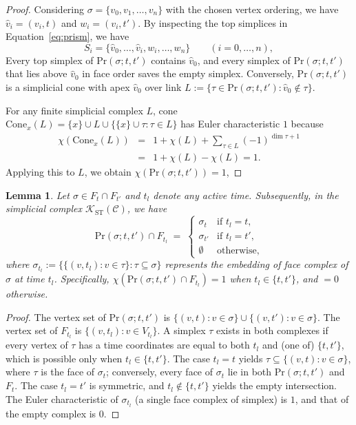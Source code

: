 \documentclass[
    pre,
    twocolumn,
    superscriptaddress,
    showpacs,
    nofootinbib,
    amsmath,
    amssymb,
    floatfix
]{revtex4-2}
\newcommand{\K}{\mathcal{K}}
\theoremstyle{plain} %
\newtheorem{lemma}[theorem]{\indent Lemma}
\theoremstyle{definition} %
\begin{document}
\begin{proof}
Considering $\sigma = \{v_0, v_1, \ldots, v_n\}$ with the chosen vertex
ordering, we have $\hat v_i = (v_i, t)$ and $w_i = (v_i, t')$.
By inspecting the top simplices in Equation~\eqref{eq:prism}, we have
\[
    S_i = \{\hat v_0, \ldots, \hat v_i, w_i, \ldots, w_n\}
    \qquad (i = 0, \ldots, n),
\]
Every top simplex of $\mathrm{Pr}(\sigma; t, t')$ contains $\hat v_0$, and every simplex of $\mathrm{Pr}(\sigma; t, t')$ that lies above $\hat v_0$ in face order saves the empty simplex.
Conversely, $\mathrm{Pr}(\sigma; t, t')$ is a simplicial cone with apex $\hat v_0$ over link $L := \{\tau \in \mathrm{Pr}(\sigma; t, t') : \hat v_0 \notin \tau\}$.

For any finite simplicial complex $L$, cone $\mathrm{Cone}_{x}(L) =
\{x\} \cup L \cup \{\{x\} \cup \tau : \tau \in L\}$ has Euler
characteristic $1$ because 
\begin{eqnarray*}
    \chi(\mathrm{Cone}_x(L))
    &=& 1 + \chi(L) + \sum_{\tau \in L}(-1)^{\dim\tau + 1}\\
    &=& 1 + \chi(L) - \chi(L) = 1.
\end{eqnarray*}
Applying this to $L$, we obtain
$\chi(\mathrm{Pr}(\sigma; t, t')) = 1$,
\end{proof}

\begin{lemma}
\label{lem:prism_snapshot}
Let $\sigma \in F_t \cap F_{t'}$ and $t_l$ denote any active time.
Subsequently, in the simplicial complex $\K_{\mathrm{ST}}(\mathcal{C})$, we have
\begin{equation*}\label{eq:prism_meet_snap}
    \mathrm{Pr}(\sigma; t, t') \cap F_{t_l}
    \;=\;
    \begin{cases}
        \sigma_t & \text{if } t_l = t,\\
        \sigma_{t'} & \text{if } t_l = t',\\
        \emptyset & \text{otherwise,}
    \end{cases}
\end{equation*}
where $\sigma_{t_l} := \{\{(v, t_l) : v \in \tau\} : \tau \subseteq \sigma\}$
represents the embedding of face complex of $\sigma$ at time $t_l$.
Specifically, $\chi(\mathrm{Pr}(\sigma; t, t') \cap F_{t_l}) = 1$ when
$t_l \in \{t, t'\}$, and $= 0$ otherwise.
\end{lemma}

\begin{proof}
The vertex set of $\mathrm{Pr}(\sigma; t, t')$ is $\{(v, t): v \in \sigma\}
\cup \{(v, t') : v \in \sigma\}$.
The vertex set of $F_{t_l}$ is $\{(v, t_l) : v \in V_{t_l}\}$.
A simplex $\tau$ exists in both complexes if every vertex of $\tau$ has a
time coordinates are equal to both $t_l$ and (one of) $\{t, t'\}$, which is
possible only when $t_l \in \{t, t'\}$.
The case $t_l = t$ yields $\tau \subseteq \{(v, t) : v \in \sigma\}$,
where $\tau$ is the face of $\sigma_t$; conversely, every face of $\sigma_t$
lie in both $\mathrm{Pr}(\sigma; t, t')$ and $F_t$.
The case $t_l = t'$ is symmetric, and $t_l \notin \{t, t'\}$ yields
the empty intersection.
The Euler characteristic of $\sigma_{t_l}$ (a single face complex of simplex) is $1$, and that of the empty complex is $0$.
\end{proof}
\end{document}
